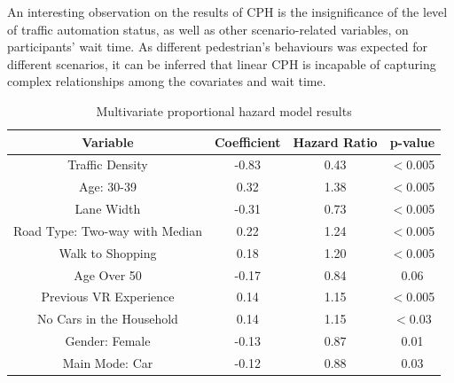 An interesting observation on the results of CPH is the insignificance of the level of traffic automation status, as well as other scenario-related variables, on participants' wait time. As different pedestrian's behaviours was expected for different scenarios, it can be inferred that linear CPH is incapable of capturing complex relationships among the covariates and wait time.   
\begin{table}
\caption{Multivariate proportional hazard model results}
\footnotesize
    \centering
    
    \begin{tabular}{|cccc|}
    \hline
         \textbf{Variable}&\textbf{Coefficient}&\textbf{Hazard Ratio}& \textbf{p-value}  \\
    \hline
         Traffic Density&-0.83& 0.43&$<$0.005\\
    \hline 
         Age: 30-39&0.32&1.38&$<$0.005\\
    \hline
         Lane Width&-0.31   &   0.73&$<$0.005\\
    \hline
         Road Type: Two-way with Median&0.22&  1.24&$<$0.005\\
    \hline
         Walk to Shopping&0.18&1.20&$<$0.005\\
    
    \hline
         Age Over 50&-0.17& 0.84&0.06\\
    
    \hline
         Previous VR Experience&0.14& 1.15&$<$0.005\\
    
    
    \hline
         No Cars in the Household&0.14&  1.15&$<$0.03\\
    \hline
         Gender: Female&-0.13& 0.87&0.01\\
    \hline
         Main Mode: Car&-0.12 & 0.88&0.03\\
    \hline
    
    
    \end{tabular}
    
    \label{tab:cox}
\end{table}

